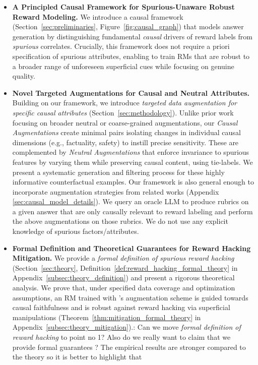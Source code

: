 \begin{itemize}[left=2pt,itemsep=0pt]
    \item \textbf{A Principled Causal Framework for Spurious-Unaware Robust Reward Modeling.}
    We introduce a causal framework (Section~\ref{sec:preliminaries}, Figure~\ref{fig:causal_graph}) that models answer generation by distinguishing fundamental \emph{causal} drivers of reward labels from \emph{spurious} correlates. Crucially, this framework does not require a priori specification of spurious attributes, enabling \carma{} to train RMs that are robust to a broader range of unforeseen superficial cues while focusing on genuine quality.

    \item \textbf{Novel Targeted Augmentations for Causal and Neutral Attributes.}
    Building on our framework, we introduce \textit{targeted data augmentation for specific causal attributes} (Section~\ref{sec:methodology}). Unlike prior work focusing on broader neutral or coarse-grained augmentations, our \emph{Causal Augmentations} create minimal pairs isolating changes in individual causal dimensions (e.g., factuality, safety) to instill precise sensitivity. These are complemented by \emph{Neutral Augmentations} that enforce invariance to spurious features by varying them while preserving causal content, using tie-labels. We present a systematic generation and filtering process for these highly informative counterfactual examples. Our framework is also general enough to incorporate augmentation strategies from related works (Appendix \ref{sec:causal_model_details}). 
    {\color{blue} We query an oracle LLM to produce rubrics on a given answer that are only causally relevant to reward labeling and perform the above augmentations on those rubrics. We do not use any explicit knowledge of spurious factors/attributes.}
    \item \textbf{Formal Definition and Theoretical Guarantees for Reward Hacking Mitigation.}
    We provide a \textit{formal definition of spurious reward hacking} (Section~\ref{sec:theory}, Definition~\ref{def:reward_hacking_formal_theory} in Appendix~\ref{subsec:theory_definition}) and present a rigorous theoretical analysis. We prove that, under specified data coverage and optimization assumptions, an RM trained with \carma{}'s augmentation scheme is guided towards causal faithfulness and is robust against reward hacking via superficial manipulations (Theorem~\ref{thm:mitigation_formal_theory} in Appendix~\ref{subsec:theory_mitigation}).{\color{brown}: Can we move \emph{formal definition of reward hacking} to point no 1? Also do we really want to claim that we provide formal guarantees ? The empirical results are stronger compared to the theory so it is better to highlight that }


\end{itemize}
